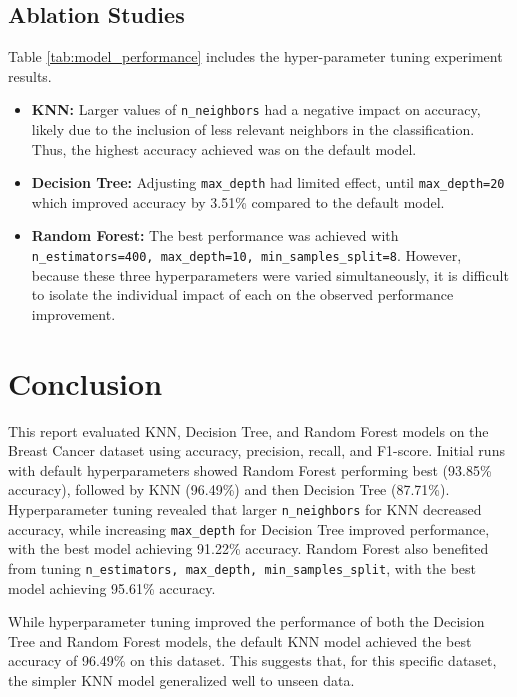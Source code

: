 \documentclass[letterpaper]{article}
\begin{document}
	\subsection{Ablation Studies} \label{ablation}
	
		Table \ref{tab:model_performance} includes the hyper-parameter tuning experiment results. 
	
		\begin{itemize}
			\item \textbf{KNN:} Larger values of \texttt{n\_neighbors} had a negative impact on accuracy, likely due to the inclusion of less relevant neighbors in the classification. Thus, the highest accuracy achieved was on the default model.
			
			\item \textbf{Decision Tree:} Adjusting \texttt{max\_depth} had limited effect, until \texttt{max\_depth=20} which improved accuracy by 3.51\% compared to the default model. 
			
			\item \textbf{Random Forest:} The best performance was achieved with \texttt{n\_estimators=400, max\_depth=10, min\_samples\_split=8}. However, because these three hyperparameters were varied simultaneously, it is difficult to isolate the individual impact of each on the observed performance improvement.
		\end{itemize}
		
	\section{Conclusion}
	
		This report evaluated KNN, Decision Tree, and Random Forest models on the Breast Cancer dataset using accuracy, precision, recall, and F1-score. Initial runs with default hyperparameters showed Random Forest performing best (93.85\% accuracy), followed by KNN (96.49\%) and then Decision Tree (87.71\%). Hyperparameter tuning revealed that larger \texttt{n\_neighbors} for KNN decreased accuracy, while increasing \texttt{max\_depth} for Decision Tree improved performance, with the best model achieving 91.22\% accuracy. Random Forest also benefited from tuning \texttt{n\_estimators, max\_depth, min\_samples\_split}, with the best model achieving 95.61\% accuracy. 
		
		While hyperparameter tuning improved the performance of both the Decision Tree and Random Forest models, the default KNN model achieved the best accuracy of 96.49\% on this dataset. This suggests that, for this specific dataset, the simpler KNN model generalized well to unseen data.
		
\end{document}

